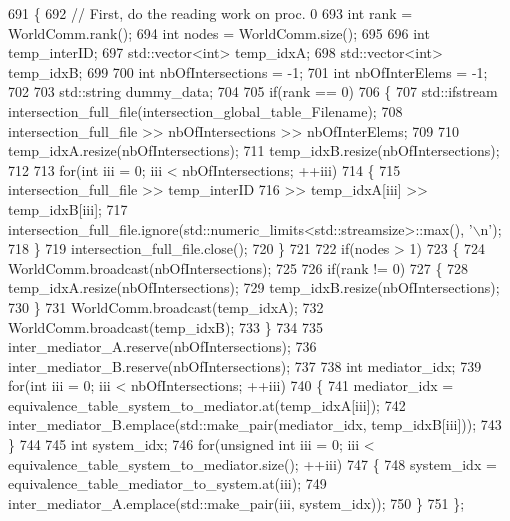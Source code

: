 \begin{DoxyCode}
691 \{
692     \textcolor{comment}{// First, do the reading work on proc. 0}
693     \textcolor{keywordtype}{int} rank = WorldComm.rank();
694     \textcolor{keywordtype}{int} nodes = WorldComm.size();
695 
696     \textcolor{keywordtype}{int}                 temp\_interID;
697     std::vector<int>    temp\_idxA;
698     std::vector<int>    temp\_idxB;
699 
700     \textcolor{keywordtype}{int} nbOfIntersections = -1;
701     \textcolor{keywordtype}{int} nbOfInterElems = -1;
702 
703     std::string dummy\_data;
704 
705     \textcolor{keywordflow}{if}(rank == 0)
706     \{
707         std::ifstream intersection\_full\_file(intersection\_global\_table\_Filename);
708         intersection\_full\_file >> nbOfIntersections >> nbOfInterElems;
709 
710         temp\_idxA.resize(nbOfIntersections);
711         temp\_idxB.resize(nbOfIntersections);
712 
713         \textcolor{keywordflow}{for}(\textcolor{keywordtype}{int} iii = 0; iii < nbOfIntersections; ++iii)
714         \{
715             intersection\_full\_file  >> temp\_interID
716                                     >> temp\_idxA[iii] >> temp\_idxB[iii];
717             intersection\_full\_file.ignore(std::numeric\_limits<std::streamsize>::max(), \textcolor{charliteral}{'\(\backslash\)n'});
718         \}
719         intersection\_full\_file.close();
720     \}
721 
722     \textcolor{keywordflow}{if}(nodes > 1)
723     \{
724         WorldComm.broadcast(nbOfIntersections);
725 
726         \textcolor{keywordflow}{if}(rank != 0)
727         \{
728             temp\_idxA.resize(nbOfIntersections);
729             temp\_idxB.resize(nbOfIntersections);
730         \}
731         WorldComm.broadcast(temp\_idxA);
732         WorldComm.broadcast(temp\_idxB);
733     \}
734 
735     inter\_mediator\_A.reserve(nbOfIntersections);
736     inter\_mediator\_B.reserve(nbOfIntersections);
737 
738     \textcolor{keywordtype}{int} mediator\_idx;
739     \textcolor{keywordflow}{for}(\textcolor{keywordtype}{int} iii = 0; iii < nbOfIntersections; ++iii)
740     \{
741         mediator\_idx = equivalence\_table\_system\_to\_mediator.at(temp\_idxA[iii]);
742         inter\_mediator\_B.emplace(std::make\_pair(mediator\_idx, temp\_idxB[iii]));
743     \}
744 
745     \textcolor{keywordtype}{int} system\_idx;
746     \textcolor{keywordflow}{for}(\textcolor{keywordtype}{unsigned} \textcolor{keywordtype}{int} iii = 0; iii < equivalence\_table\_system\_to\_mediator.size(); ++iii)
747     \{
748         system\_idx = equivalence\_table\_mediator\_to\_system.at(iii);
749         inter\_mediator\_A.emplace(std::make\_pair(iii, system\_idx));
750     \}
751 \};
\end{DoxyCode}
\hypertarget{namespacecarl_a880bd07cae964f085e21e5ac75ede10d}{}
